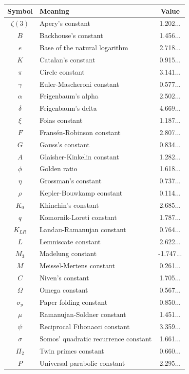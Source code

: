 \documentclass[12pt]{article}
\begin{document}
\begin{table}[h]
\centering
\begin{tabular}{c | l | c}
Symbol & Meaning & Value \\ \hline \hline
$\zeta(3)$ & Apery's constant & 1.202...\\ \hline
$B$ & Backhouse's constant & 1.456...\\ \hline
$e$ & Base of the natural logarithm & 2.718...\\ \hline
$K$ & Catalan's constant & 0.915...\\ \hline
$\pi$ & Circle constant & 3.141...\\ \hline
$\gamma$ & Euler-Mascheroni constant & 0.577...\\ \hline
$\alpha$ & Feigenbaum's alpha & 2.502...\\ \hline
$\delta$ & Feigenbaum's delta & 4.669...\\ \hline
$\xi$ & Foias constant & 1.187... \\ \hline
$F$ & Frans\'en-Robinson constant & 2.807...\\ \hline
$G$ & Gauss's constant & 0.834...\\ \hline
$A$ & Glaisher-Kinkelin constant & 1.282...\\ \hline
$\phi$ & Golden ratio & 1.618... \\ \hline
$\eta$ & Grossman's constant & 0.737... \\ \hline
$\rho$ & Kepler-Bouwkamp constant & 0.114...\\ \hline
$K_{0}$ & Khinchin's constant & 2.685...\\ \hline
$q$ & Komornik-Loreti constant & 1.787...\\ \hline
$K_{LR}$ & Landau-Ramanujan constant & 0.764...\\ \hline
$L$ & Lemniscate constant & 2.622...\\ \hline
$M_{3}$ & Madelung constant & -1.747...\\ \hline
$M$ & Meissel-Mertens constant & 0.261...\\ \hline
$C$ & Niven's constant & 1.705...\\ \hline
$\Omega$ & Omega constant & 0.567...\\ \hline
$\sigma_{p}$ & Paper folding constant & 0.850... \\ \hline
$\mu$ & Ramanujan-Soldner constant & 1.451...\\ \hline
$\psi$ & Reciprocal Fibonacci constant & 3.359...\\ \hline
$\sigma$ & Somos' quadratic recurrence constant & 1.661...\\ \hline
$\Pi_{2}$ & Twin primes constant & 0.660...\\ \hline
$P$ & Universal parabolic constant & 2.295...\\ \hline
\end{tabular}
\end{table}
\end{document}

